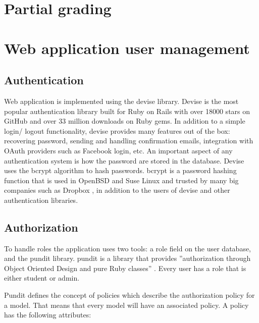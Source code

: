 \section{Partial grading}

\section{Web application user management}
\subsection{Authentication}
Web application is implemented using the devise library. Devise is the most popular authentication library built for Ruby on Rails with over 18000 stars on GitHub and over 33 million downloads on Ruby gems. In addition to a simple login/ logout functionality, devise provides many features out of the box: recovering password, sending and handling confirmation emails, integration with OAuth providers such as Facebook login, etc. An important aspect of any authentication system is how the password are stored in the database. Devise uses the bcrypt algorithm to hash passwords. bcrypt is a password hashing function \citep{wiki:bcrypt} that is used in OpenBSD and Suse Linux and trusted by many big companies such as Dropbox \citep{dropbox:authentication}, in addition to the users of devise and other authentication libraries.

\subsection{Authorization}
To handle roles the application uses two tools: a role field on the user database, and the pundit library. pundit is a library that provides ''authorization through Object Oriented Design and pure Ruby classes'' \citep{github:pundit}. Every user has a role that is either student or admin.

Pundit defines the concept of policies which describe the authorization policy for a model. That means that every model will have an associated policy. A policy has the following attributes:


